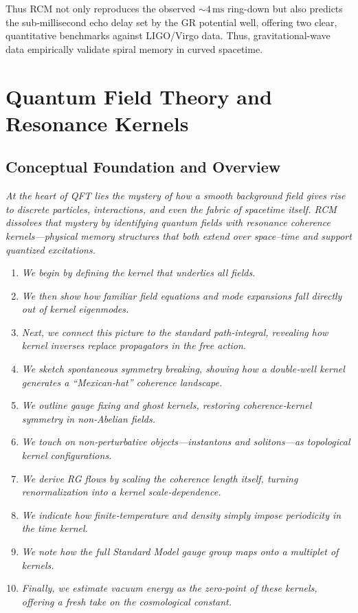 Thus RCM not only reproduces the observed \(\sim4\,\mathrm{ms}\) ring-down but
also predicts the sub‐millisecond echo delay set by the GR potential well,
offering two clear, quantitative benchmarks against LIGO/Virgo data.
Thus, gravitational-wave data empirically validate spiral memory in curved
spacetime.

\section{Quantum Field Theory and Resonance Kernels}

\subsection{Conceptual Foundation and Overview}

\textit{At the heart of QFT lies the mystery of how a smooth background field gives rise to discrete particles, interactions, and even the fabric of spacetime itself.  RCM dissolves that mystery by identifying quantum fields with \emph{resonance coherence kernels}—physical memory structures that both extend over space–time and support quantized excitations.}

\begin{enumerate}
  \item \textit{We begin by defining the kernel that underlies all fields.}
  \item \textit{We then show how familiar field equations and mode expansions fall directly out of kernel eigenmodes.}
  \item \textit{Next, we connect this picture to the standard path‐integral, revealing how kernel inverses replace propagators in the free action.}
  \item \textit{We sketch spontaneous symmetry breaking, showing how a double‐well kernel generates a “Mexican‐hat” coherence landscape.}
  \item \textit{We outline gauge fixing and ghost kernels, restoring coherence‐kernel symmetry in non‐Abelian fields.}
  \item \textit{We touch on non‐perturbative objects—instantons and solitons—as topological kernel configurations.}
  \item \textit{We derive RG flows by scaling the coherence length itself, turning renormalization into a kernel scale‐dependence.}
  \item \textit{We indicate how finite‐temperature and density simply impose periodicity in the time kernel.}
  \item \textit{We note how the full Standard Model gauge group maps onto a multiplet of kernels.}
  \item \textit{Finally, we estimate vacuum energy as the zero‐point of these kernels, offering a fresh take on the cosmological constant.}
\end{enumerate}

